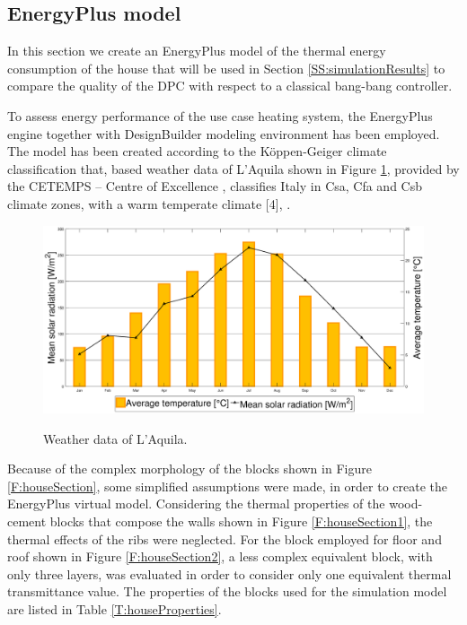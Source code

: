\subsection{EnergyPlus model}\label{SS:energyPlusmodel}
In this section we create an EnergyPlus model of the thermal energy consumption of the house that will be used in Section \ref{SS:simulationResults} to compare the quality of the DPC with respect to a classical bang-bang controller.

To assess energy performance of the use case heating system, the EnergyPlus engine together with DesignBuilder modeling environment has been employed. The model has been created according to the K\"{o}ppen-Geiger climate classification that, based weather data of L'Aquila shown in Figure \ref{F:houseExternalWeather}, provided by the CETEMPS – Centre of Excellence \cite{CETEMPS}, classifies Italy in Csa, Cfa and Csb climate zones, with a warm temperate climate [4], .

\begin{figure}[h!]
	\begin{center}
		\includegraphics[width=30pc]{figures/dati_climatici_rev01.eps}
		\caption{Weather data of L'Aquila.}
		\captionsetup{justification=centering}
		\label{F:houseExternalWeather}
	\end{center}
\end{figure}

Because of the complex morphology of the blocks shown in Figure \ref{F:houseSection}, some simplified assumptions were made, in order to create the EnergyPlus virtual model. Considering the thermal properties of the wood-cement blocks that compose the walls shown in Figure \ref{F:houseSection1}, the thermal effects of the ribs were neglected. For the block employed for floor and roof shown in Figure \ref{F:houseSection2}, a less complex equivalent block, with only three layers, was evaluated in order to consider only one equivalent thermal transmittance value. The properties of the blocks used for the simulation model are listed in Table \ref{T:houseProperties}.    

